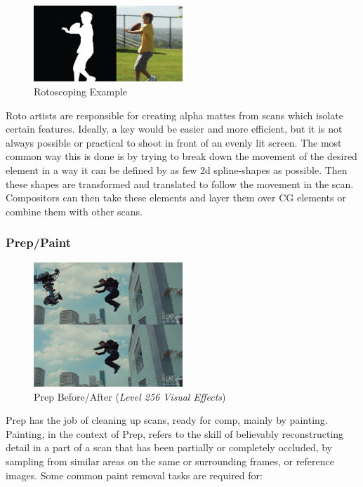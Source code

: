 \begin{figure}
\includegraphics[width=0.5\textwidth,height=\textheight]{./images/roto_before_after.png}
\caption{Rotoscoping Example}
\end{figure}

Roto artists are responsible for creating alpha mattes from scans which isolate certain features. Ideally, a key would be easier and more efficient, but it is not always possible or practical to shoot in front of an evenly lit screen. The most common way this is done is by trying to break down the movement of the desired element in a way it can be defined by as few 2d spline-shapes as possible. Then these shapes are transformed and translated to follow the movement in the scan. Compositors can then take these elements and layer them over CG elements or combine them with other scans.

\hypertarget{preppaint}{%
\subsubsection{Prep/Paint}\label{preppaint}}

\begin{figure}
\includegraphics[width=0.5\textwidth,height=\textheight]{./images/prep_before_after.png}
\caption{Prep Before/After (\emph{Level 256 Visual Effects})}
\end{figure}

Prep has the job of cleaning up scans, ready for comp, mainly by painting. Painting, in the context of Prep, refers to the skill of believably reconstructing detail in a part of a scan that has been partially or completely occluded, by sampling from similar areas on the same or surrounding frames, or reference images. Some common paint removal tasks are required for:

